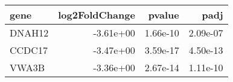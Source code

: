 \begin{tabular}{lrrr}
\toprule
  gene &  log2FoldChange &   pvalue &     padj \\
\midrule
DNAH12 &       -3.61e+00 & 1.66e-10 & 2.09e-07 \\
CCDC17 &       -3.47e+00 & 3.59e-17 & 4.50e-13 \\
 VWA3B &       -3.36e+00 & 2.67e-14 & 1.11e-10 \\
\bottomrule
\end{tabular}
